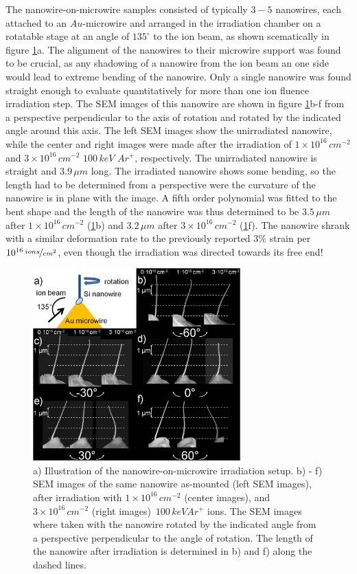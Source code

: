 The nanowire-on-microwire samples consisted of typically $3-5$ nanowires, each attached to an $Au$-microwire and arranged in the irradiation chamber on a rotatable stage at an angle of $135^\circ$ to the ion beam, as shown scematically in figure \ref{reverseangle}a. The alignment of the nanowires to their microwire support was found to be crucial, as any shadowing of a nanowire from the ion beam an one side would lead to extreme bending of the nanowire. Only a single nanowire was found straight enough to evaluate quantitatively for more than one ion fluence irradiation step. The SEM images of this nanowire are shown in figure \ref{reverseangle}b-f from a perspective perpendicular to the axis of rotation and rotated by the indicated angle around this axis. The left SEM images show the unirradiated nanowire, while the center and right images were made after the irradiation of $1\times10^{16}\,cm^{-2}$ and $3\times10^{16}\,cm^{-2}$ $100\,keV\,\,Ar^+$, respectively. The unirradiated nanowire is straight and $3.9\,\mu m$ long. The irradiated nanowire shows some bending, so the length had to be determined from a perspective were the curvature of the nanowire is in plane with the image. A fifth order polynomial was fitted to the bent shape and the length of the nanowire was thus determined to be $3.5\,\mu m$ after $1\times10^{16}\,cm^{-2}$ (\ref{reverseangle}b) and $3.2\,\mu m$ after $3\times10^{16}\,cm^{-2}$ (\ref{reverseangle}f). The nanowire shrank with a similar deformation rate to the previously reported $3\%$ strain per $10^{16}\,\nicefrac{ions}{cm^2}$, even though the irradiation was directed towards its free end!

\begin{figure}[thbp]
	\centering
		\includegraphics[width=8cm]{images/reverseangle.jpg}
	\caption{ a) Illustration of the nanowire-on-microwire irradiation setup. b) - f) SEM images of the same nanowire as-mounted (left SEM images), after irradiation with $1\times10^{16}\,cm^{-2}$  (center images), and $3\times10^{16}\,cm^{-2}$ (right images) $\,100\,keV Ar^+$ ions. The SEM images where taken with the nanowire rotated by the indicated angle from a perspective perpendicular to the angle of rotation. The length of the nanowire after irradiation is determined in b) and f) along the dashed lines.}
	\label{reverseangle}
\end{figure}

